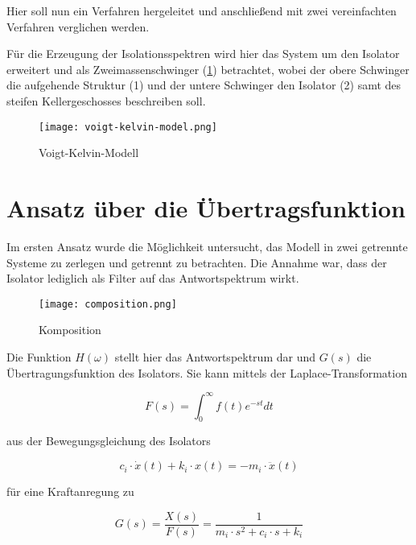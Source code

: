 Hier soll nun ein Verfahren hergeleitet und anschließend mit zwei vereinfachten Verfahren verglichen werden. 

Für die Erzeugung der Isolationsspektren wird hier das System um den Isolator erweitert und als Zweimassenschwinger (\cref{fig:vkm}) betrachtet, wobei der obere Schwinger die aufgehende Struktur (1) und der untere Schwinger den Isolator (2) samt des steifen Kellergeschosses beschreiben soll.

\begin{figure}[ht]
    \centering
    \texttt{[image: voigt-kelvin-model.png]}
    \caption{Voigt-Kelvin-Modell}
    \label{fig:vkm}
\end{figure}

\section{Ansatz über die Übertragsfunktion}
\label{sec:ansatzfunktion}

Im ersten Ansatz wurde die Möglichkeit untersucht, das Modell in zwei getrennte Systeme zu zerlegen und getrennt zu betrachten.
Die Annahme war, dass der Isolator lediglich als Filter auf das Antwortspektrum wirkt.

\begin{figure}[H]
    \centering
    \texttt{[image: composition.png]}
    \caption{Komposition}
    \label{fig:composition}
\end{figure}

Die Funktion $H(\omega)$ stellt hier das Antwortspektrum dar und $G(s)$ die Übertragungsfunktion des Isolators.
Sie kann mittels der Laplace-Transformation

\begin{equation} \label{laplace}
F(s) = \int_{0}^{\infty} f(t)e^{-st}dt
\end{equation}

aus der Bewegungsgleichung des Isolators \cite{Kramer}

\begin{equation}\label{eq:bewegungsgleichung}
c_i \cdot \dot x(t) + k_i \cdot x(t) = - m_i \cdot \ddot x(t)
\end{equation}

für eine Kraftanregung zu

\begin{equation} \label{laplace2}
G(s)=\frac{X(s)}{F(s)} = \frac{1}{m_i \cdot s^2 + c_i \cdot s + k_i}
\end{equation}

